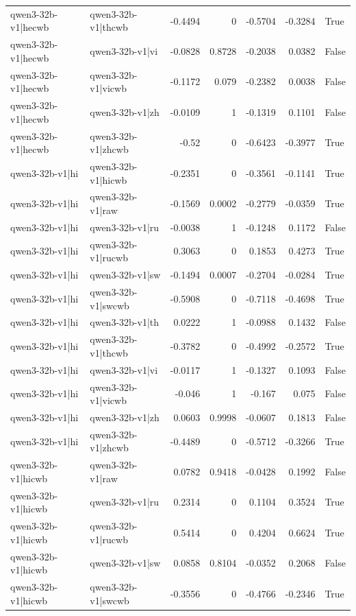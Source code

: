 \begin{table}
\begin{tabular}{l l r r r r l}
qwen3-32b-v1|hecwb & qwen3-32b-v1|thcwb & -0.4494 & 0 & -0.5704 & -0.3284 & True \\
qwen3-32b-v1|hecwb & qwen3-32b-v1|vi & -0.0828 & 0.8728 & -0.2038 & 0.0382 & False \\
qwen3-32b-v1|hecwb & qwen3-32b-v1|vicwb & -0.1172 & 0.079 & -0.2382 & 0.0038 & False \\
qwen3-32b-v1|hecwb & qwen3-32b-v1|zh & -0.0109 & 1 & -0.1319 & 0.1101 & False \\
qwen3-32b-v1|hecwb & qwen3-32b-v1|zhcwb & -0.52 & 0 & -0.6423 & -0.3977 & True \\
qwen3-32b-v1|hi & qwen3-32b-v1|hicwb & -0.2351 & 0 & -0.3561 & -0.1141 & True \\
qwen3-32b-v1|hi & qwen3-32b-v1|raw & -0.1569 & 0.0002 & -0.2779 & -0.0359 & True \\
qwen3-32b-v1|hi & qwen3-32b-v1|ru & -0.0038 & 1 & -0.1248 & 0.1172 & False \\
qwen3-32b-v1|hi & qwen3-32b-v1|rucwb & 0.3063 & 0 & 0.1853 & 0.4273 & True \\
qwen3-32b-v1|hi & qwen3-32b-v1|sw & -0.1494 & 0.0007 & -0.2704 & -0.0284 & True \\
qwen3-32b-v1|hi & qwen3-32b-v1|swcwb & -0.5908 & 0 & -0.7118 & -0.4698 & True \\
qwen3-32b-v1|hi & qwen3-32b-v1|th & 0.0222 & 1 & -0.0988 & 0.1432 & False \\
qwen3-32b-v1|hi & qwen3-32b-v1|thcwb & -0.3782 & 0 & -0.4992 & -0.2572 & True \\
qwen3-32b-v1|hi & qwen3-32b-v1|vi & -0.0117 & 1 & -0.1327 & 0.1093 & False \\
qwen3-32b-v1|hi & qwen3-32b-v1|vicwb & -0.046 & 1 & -0.167 & 0.075 & False \\
qwen3-32b-v1|hi & qwen3-32b-v1|zh & 0.0603 & 0.9998 & -0.0607 & 0.1813 & False \\
qwen3-32b-v1|hi & qwen3-32b-v1|zhcwb & -0.4489 & 0 & -0.5712 & -0.3266 & True \\
qwen3-32b-v1|hicwb & qwen3-32b-v1|raw & 0.0782 & 0.9418 & -0.0428 & 0.1992 & False \\
qwen3-32b-v1|hicwb & qwen3-32b-v1|ru & 0.2314 & 0 & 0.1104 & 0.3524 & True \\
qwen3-32b-v1|hicwb & qwen3-32b-v1|rucwb & 0.5414 & 0 & 0.4204 & 0.6624 & True \\
qwen3-32b-v1|hicwb & qwen3-32b-v1|sw & 0.0858 & 0.8104 & -0.0352 & 0.2068 & False \\
qwen3-32b-v1|hicwb & qwen3-32b-v1|swcwb & -0.3556 & 0 & -0.4766 & -0.2346 & True \\

\end{tabular}
\end{table}
